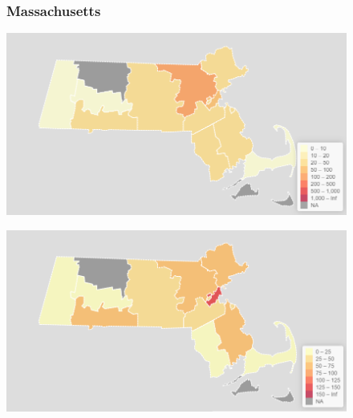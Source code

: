 \documentclass[11pt]{article}
\begin{document}
\begin{landscape}
\thispagestyle{empty}
\begin{figure}[h]
\subsubsection*{Massachusetts}
\hspace*{-3cm}
\begin{minipage}{.8\textwidth}
    \includegraphics[width=.95\textwidth]{ImageResults/MassachusettsTotal.PNG}
\end{minipage}%
\begin{minipage}{.8\textwidth}
    \includegraphics[width=.95\textwidth]{ImageResults/Massachusetts100k.PNG}
    \label{fig:Mass100k}
\end{minipage}

\end{figure}
\end{landscape}
\end{document}
